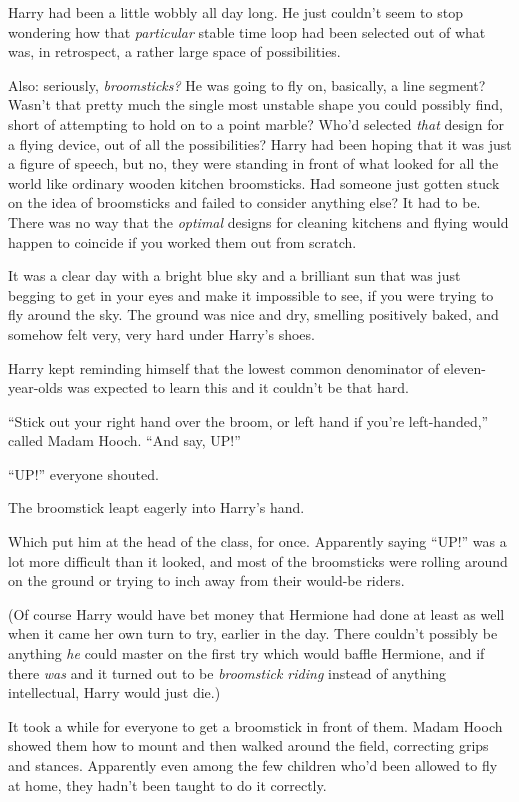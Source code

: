 Harry had been a little wobbly all day long. He just couldn't seem to
stop wondering how that \emph{particular} stable time loop had been
selected out of what was, in retrospect, a rather large space of
possibilities.

Also: seriously, \emph{broomsticks?} He was going to fly on, basically,
a line segment? Wasn't that pretty much the single most unstable shape
you could possibly find, short of attempting to hold on to a point
marble? Who'd selected \emph{that} design for a flying device, out of
all the possibilities? Harry had been hoping that it was just a figure
of speech, but no, they were standing in front of what looked for all
the world like ordinary wooden kitchen broomsticks. Had someone just
gotten stuck on the idea of broomsticks and failed to consider anything
else? It had to be. There was no way that the \emph{optimal} designs for
cleaning kitchens and flying would happen to coincide if you worked them
out from scratch.

It was a clear day with a bright blue sky and a brilliant sun that was
just begging to get in your eyes and make it impossible to see, if you
were trying to fly around the sky. The ground was nice and dry, smelling
positively baked, and somehow felt very, very hard under Harry's shoes.

Harry kept reminding himself that the lowest common denominator of
eleven-year-olds was expected to learn this and it couldn't be that
hard.

``Stick out your right hand over the broom, or left hand if you're
left-handed,'' called Madam Hooch. ``And say, UP!''

``UP!'' everyone shouted.

The broomstick leapt eagerly into Harry's hand.

Which put him at the head of the class, for once. Apparently saying
``UP!'' was a lot more difficult than it looked, and most of the
broomsticks were rolling around on the ground or trying to inch away
from their would-be riders.

(Of course Harry would have bet money that Hermione had done at least as
well when it came her own turn to try, earlier in the day. There
couldn't possibly be anything \emph{he} could master on the first try
which would baffle Hermione, and if there \emph{was} and it turned out
to be \emph{broomstick riding} instead of anything intellectual, Harry
would just die.)

It took a while for everyone to get a broomstick in front of them. Madam
Hooch showed them how to mount and then walked around the field,
correcting grips and stances. Apparently even among the few children
who'd been allowed to fly at home, they hadn't been taught to do it
correctly.

